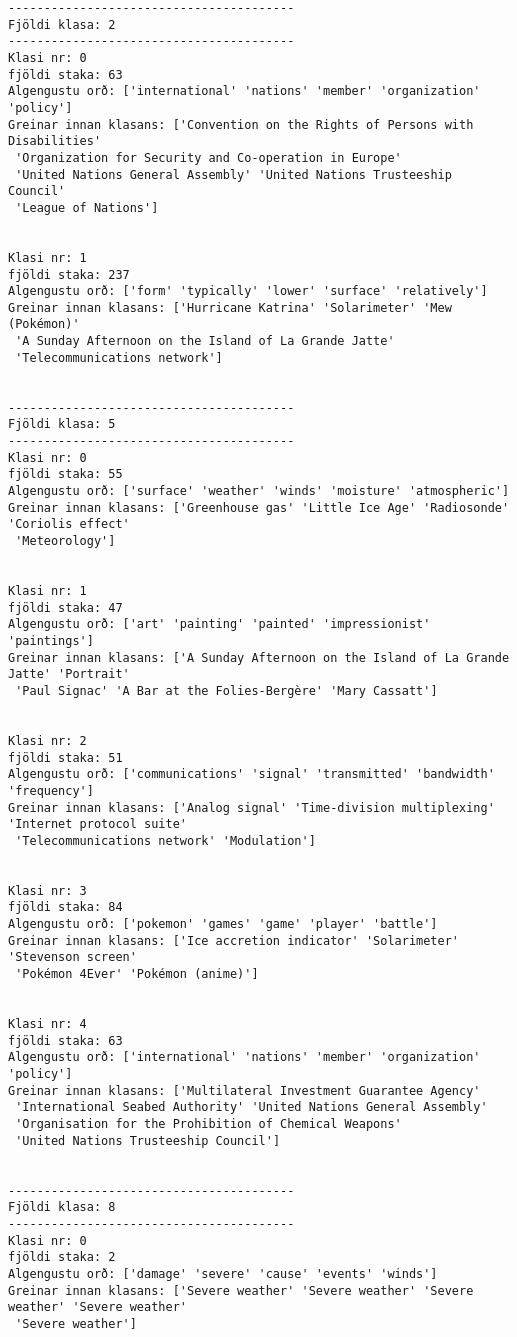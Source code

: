 \documentclass[11pt]{article}
\begin{document}
    \begin{Verbatim}[commandchars=\\\{\}]
----------------------------------------
Fjöldi klasa: 2
----------------------------------------
Klasi nr: 0
fjöldi staka: 63
Algengustu orð: ['international' 'nations' 'member' 'organization' 'policy']
Greinar innan klasans: ['Convention on the Rights of Persons with Disabilities'
 'Organization for Security and Co-operation in Europe'
 'United Nations General Assembly' 'United Nations Trusteeship Council'
 'League of Nations']


Klasi nr: 1
fjöldi staka: 237
Algengustu orð: ['form' 'typically' 'lower' 'surface' 'relatively']
Greinar innan klasans: ['Hurricane Katrina' 'Solarimeter' 'Mew (Pokémon)'
 'A Sunday Afternoon on the Island of La Grande Jatte'
 'Telecommunications network']


----------------------------------------
Fjöldi klasa: 5
----------------------------------------
Klasi nr: 0
fjöldi staka: 55
Algengustu orð: ['surface' 'weather' 'winds' 'moisture' 'atmospheric']
Greinar innan klasans: ['Greenhouse gas' 'Little Ice Age' 'Radiosonde' 'Coriolis effect'
 'Meteorology']


Klasi nr: 1
fjöldi staka: 47
Algengustu orð: ['art' 'painting' 'painted' 'impressionist' 'paintings']
Greinar innan klasans: ['A Sunday Afternoon on the Island of La Grande Jatte' 'Portrait'
 'Paul Signac' 'A Bar at the Folies-Bergère' 'Mary Cassatt']


Klasi nr: 2
fjöldi staka: 51
Algengustu orð: ['communications' 'signal' 'transmitted' 'bandwidth' 'frequency']
Greinar innan klasans: ['Analog signal' 'Time-division multiplexing' 'Internet protocol suite'
 'Telecommunications network' 'Modulation']


Klasi nr: 3
fjöldi staka: 84
Algengustu orð: ['pokemon' 'games' 'game' 'player' 'battle']
Greinar innan klasans: ['Ice accretion indicator' 'Solarimeter' 'Stevenson screen'
 'Pokémon 4Ever' 'Pokémon (anime)']


Klasi nr: 4
fjöldi staka: 63
Algengustu orð: ['international' 'nations' 'member' 'organization' 'policy']
Greinar innan klasans: ['Multilateral Investment Guarantee Agency'
 'International Seabed Authority' 'United Nations General Assembly'
 'Organisation for the Prohibition of Chemical Weapons'
 'United Nations Trusteeship Council']


----------------------------------------
Fjöldi klasa: 8
----------------------------------------
Klasi nr: 0
fjöldi staka: 2
Algengustu orð: ['damage' 'severe' 'cause' 'events' 'winds']
Greinar innan klasans: ['Severe weather' 'Severe weather' 'Severe weather' 'Severe weather'
 'Severe weather']



\end{Verbatim}
\end{document}
